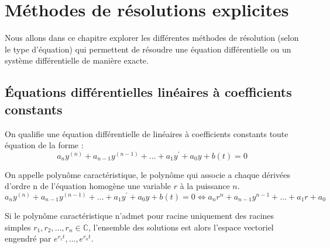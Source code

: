 \chapter{Méthodes de résolutions explicites}
Nous allons dans ce chapitre explorer les différentes méthodes de résolution (selon le type d'équation) qui permettent de résoudre une équation différentielle ou un système différentielle de manière exacte.
\section{Équations différentielles linéaires à coefficients constants}
\begin{defi}
On qualifie une équation différentielle de linéaires à coefficients constants toute équation de la forme :
$$a_ny^{(n)}+a_{n-1}y^{(n-1)}+\hdots+a_1y^{\prime}+a_0y+b(t)=0$$
\end{defi}

\begin{prop}
On appelle polynôme caractéristique, le polynôme qui associe a chaque dérivées d'ordre n de l'équation homogène une variable $r$ à la puissance $n$.
$$a_ny^{(n)}+a_{n-1}y^{(n-1)}+\hdots+a_1y^{\prime}+a_0y+b(t)=0\Leftrightarrow a_nr^{n}+a_{n-1}y^{n-1}+\hdots+a_1r+a_0$$
\end{prop}
\begin{thm}
Si le polynôme caractéristique n'admet pour racine uniquement des racines simples $r_1,r_2,\hdots,r_n\in\mathbb{C}$, l'ensemble des solutions est alors l'espace vectoriel engendré par ${e^{r_1t},\hdots,e^{r_nt}}$.
\end{thm}






